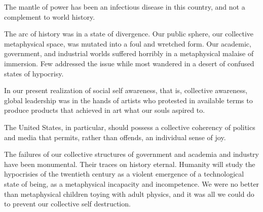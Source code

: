 

﻿The mantle of power has been an infectious disease in this country,
and not a complement to world history.

The arc of history was in a state of divergence.  Our public sphere,
our collective metaphysical space, was mutated into a foul and
wretched form.  Our academic, government, and industrial worlds
suffered horribly in a metaphysical malaise of immersion.  Few
addressed the issue while most wandered in a desert of confused states
of hypocrisy.

In our present realization of social self awareness, that is,
collective awareness, global leadership was in the hands of artists
who protested in available terms to produce products that achieved in
art what our souls aspired to.

The United States, in particular, should possess a collective
coherency of politics and media that permits, rather than offends, an
individual sense of joy.

The failures of our collective structures of government and academia
and industry have been monumental.  Their traces on history eternal.
Humanity will study the hypocrisies of the twentieth century as a
violent emergence of a technological state of being, as a metaphysical
incapacity and incompetence.  We were no better than metaphysical
children toying with adult physics, and it was all we could do to
prevent our collective self destruction.

\bye
